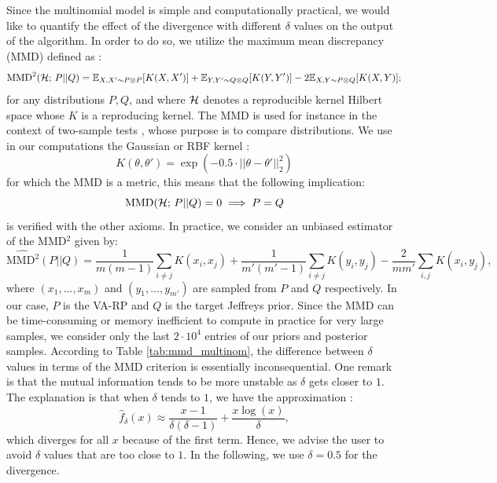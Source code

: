 Since the multinomial model is simple and computationally practical, we would like to quantify the effect of the divergence with different $\delta$ values on the output of the algorithm. In order to do so, we utilize the maximum mean discrepancy (MMD) defined as : 
\begin{equation}
    \text{MMD}^2(\mathcal{H};\,P||Q) = \mathbb{E}_{X,X'\sim P\otimes P}[K(X,X')] + \mathbb{E}_{Y,Y'\sim Q\otimes Q}[K(Y,Y')] - 2\mathbb{E}_{X,Y\sim P\otimes Q}[K(X,Y)];
\end{equation}
for any distributions $P,Q$, and where $\mathcal{H}$ denotes a reproducible kernel Hilbert space whose $K$ is a reproducing kernel. %
The MMD is used for instance in the context of two-sample tests \citep{gretton_kernel_2012}, whose purpose is to compare distributions. We use in our computations the Gaussian or RBF kernel : 
\begin{equation}
    K(\theta, \theta') = \exp(-0.5 \cdot ||\theta - \theta'||_2^2)
\end{equation} 
for which the MMD is a metric, this means that the following implication: 
\begin{equation}
    \text{MMD}(\mathcal{H};\,P||Q) = 0 \implies P=Q
\end{equation}
is verified with the other axioms. In practice, 
we consider an unbiased estimator of the MMD$^2$ given by: 
\begin{equation}
    \widehat{\text{MMD}^2}(P||Q) =  \frac{1}{m(m-1)} \sum_{i \neq j}K(x_i,x_j) +  \frac{1}{m'(m'-1)} \sum_{i \neq j}K(y_i,y_j) - \frac{2}{mm'} \sum_{i,j} K(x_i,y_j),
\end{equation}
where $(x_1,...,x_m)$ and $(y_1,...,y_{m'})$ are sampled from $P$ and $Q$ respectively. In our case, $P$ is the VA-RP and $Q$ is the target Jeffreys prior. Since the MMD can be time-consuming or memory inefficient to compute in practice for very large samples, we consider only the last $2 \cdot 10^4$ entries of our priors and posterior samples.
According to Table \ref{tab:mmd_multinom}, the difference between $\delta$ values in terms of the MMD criterion is essentially inconsequential. One remark is that the mutual information tends to be more unstable as $\delta$ gets closer to $1$. The explanation is that when $\delta$ tends to $1$, we have the approximation :
\begin{equation}
    \hat{f}_{\delta}(x) \approx \frac{x-1}{\delta(\delta-1)} + \frac{x\log(x)}{\delta},
\end{equation}
which diverges for all $x$ because of the first term. Hence, we advise the user to avoid $\delta$ values that are too close to $1$. In the following, we use $\delta = 0.5$ for the divergence.


